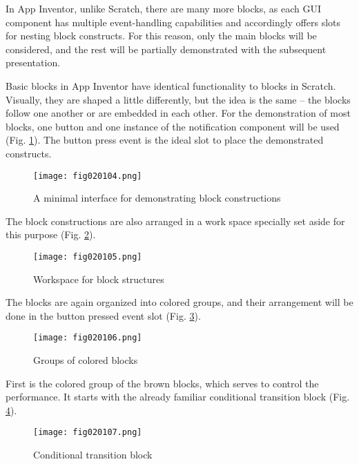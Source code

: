 In App Inventor, unlike Scratch, there are many more blocks, as each GUI component has multiple event-handling capabilities and accordingly offers slots for nesting block constructs. For this reason, only the main blocks will be considered, and the rest will be partially demonstrated with the subsequent presentation.

Basic blocks in App Inventor have identical functionality to blocks in Scratch. Visually, they are shaped a little differently, but the idea is the same – the blocks follow one another or are embedded in each other. For the demonstration of most blocks, one button and one instance of the notification component will be used (Fig. \ref{fig020104}). The button press event is the ideal slot to place the demonstrated constructs.

\begin{figure}[H]
   \centering
   \texttt{[image: fig020104.png]}
   \caption{A minimal interface for demonstrating block constructions}
\label{fig020104}
\end{figure}

The block constructions are also arranged in a work space specially set aside for this purpose (Fig. \ref{fig020105}).

\begin{figure}[H]
   \centering
   \texttt{[image: fig020105.png]}
   \caption{Workspace for block structures}
\label{fig020105}
\end{figure}

The blocks are again organized into colored groups, and their arrangement will be done in the button pressed event slot (Fig. \ref{fig020106}).

\begin{figure}[H]
   \centering
   \texttt{[image: fig020106.png]}
   \caption{Groups of colored blocks}
\label{fig020106}
\end{figure}

First is the colored group of the brown blocks, which serves to control the performance. It starts with the already familiar conditional transition block (Fig. \ref{fig020107}).

\begin{figure}[H]
   \centering
   \texttt{[image: fig020107.png]}
   \caption{Conditional transition block}
\label{fig020107}
\end{figure}

